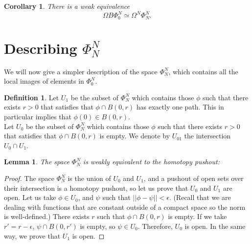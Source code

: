 \documentclass[12pt]{amsart}
\theoremstyle{plain}
\newtheorem{cor}[teo]{Corollary}
\newtheorem{lem}[teo]{Lemma}
\theoremstyle{definition}
\newtheorem{defi}[teo]{Definition}
\theoremstyle{remark}
\begin{document}
\begin{cor}\label{loopdeloop}
    There is a weak equivalence \[\Omega B \Phi_0^N \simeq \Omega^N \Phi_N^N.\]
\end{cor} 

\section{Describing $\Phi_N^N$}

We will now give a simpler description of the space $\Phi_N^N$, which contains all the local images of elements in $\Phi_0^N$.
\begin{defi}
    Let $U_1$ be the subset of $\Phi_N^N$ which contains those $\phi$ such that there exists $r>0$ that satisfies that $\phi\cap B(0,r)$ has exactly one path. 
    This in particular implies that $\phi(0)\in B(0,r)$.\\
    Let $U_0$ be the subset of $\Phi_N^N$ which contains those $\phi$ such that there exists $r>0$ that satisfies that $\phi\cap B(0,r)$ is empty.
    We denote by $U_{01}$ the intersection $U_0\cap U_1$.
\end{defi}

\begin{lem}
    The space $\Phi_N^N$ is weakly equivalent to the homotopy pushout:
    \begin{center}
    \end{center}
\end{lem}

\begin{proof}
The space $\Phi_N^N$ is the union of $U_0$ and $U_1$, and a pushout of open sets over their intersection is a homotopy pushout,
so let us prove that $U_0$ and $U_1$ are open.
Let us take $\phi\in U_0$, and $\psi$ such that $\vert\vert \phi -\psi\vert\vert < \epsilon$. (Recall that we are dealing with functions that are constant outside of a compact space so the norm is well-defined.)
There exists $r$ such that $\phi\cap B(0,r)$ is empty.
If we take $r'=r-\epsilon$, $\psi\cap B(0,r')$ is empty, so $\psi\in U_0$.
Therefore, $U_0$ is open.
In the same way, we prove that $U_1$ is open.
\end{proof}
\end{document}
